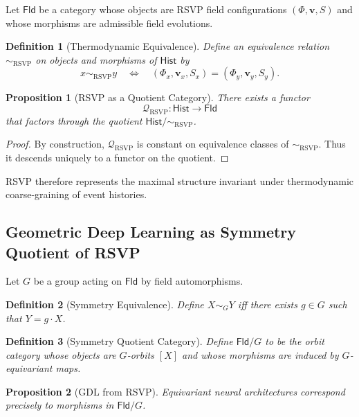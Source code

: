 \documentclass[11pt]{article}
\newtheorem{definition}{Definition}
\newtheorem{proposition}{Proposition}
\begin{document}
Let $\mathsf{Fld}$ be a category whose objects are RSVP field configurations
$(\Phi,\mathbf{v},S)$ and whose morphisms are admissible field evolutions.

\begin{definition}[Thermodynamic Equivalence]
Define an equivalence relation $\sim_{\mathrm{RSVP}}$ on objects and morphisms of
$\mathsf{Hist}$ by
\[
x \sim_{\mathrm{RSVP}} y
\quad \Longleftrightarrow \quad
(\Phi_x,\mathbf{v}_x,S_x) = (\Phi_y,\mathbf{v}_y,S_y).
\]
\end{definition}

\begin{proposition}[RSVP as a Quotient Category]
There exists a functor
\[
\mathcal{Q}_{\mathrm{RSVP}} : \mathsf{Hist} \to \mathsf{Fld}
\]
that factors through the quotient $\mathsf{Hist}/\!\sim_{\mathrm{RSVP}}$.
\end{proposition}

\begin{proof}
By construction, $\mathcal{Q}_{\mathrm{RSVP}}$ is constant on equivalence classes
of $\sim_{\mathrm{RSVP}}$. Thus it descends uniquely to a functor on the quotient.
\end{proof}

RSVP therefore represents the maximal structure invariant under thermodynamic
coarse-graining of event histories.

\subsection{Geometric Deep Learning as Symmetry Quotient of RSVP}

Let $G$ be a group acting on $\mathsf{Fld}$ by field automorphisms.

\begin{definition}[Symmetry Equivalence]
Define $X \sim_G Y$ iff there exists $g \in G$ such that $Y = g \cdot X$.
\end{definition}

\begin{definition}[Symmetry Quotient Category]
Define $\mathsf{Fld}/G$ to be the orbit category whose objects are $G$-orbits
$[X]$ and whose morphisms are induced by $G$-equivariant maps.
\end{definition}

\begin{proposition}[GDL from RSVP]
Equivariant neural architectures correspond precisely to morphisms in
$\mathsf{Fld}/G$.
\end{proposition}
\end{document}
